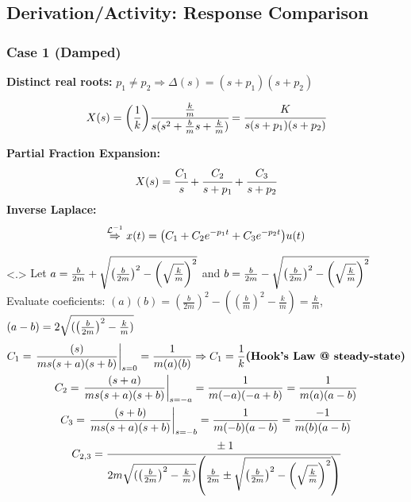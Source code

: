 \documentclass[aspectratio=169]{beamer}
\begin{document}
\subsection{Derivation/Activity: Response Comparison}
\begin{frame}
	\frametitle{Case 1 (Damped)}

	\textbf{Distinct real roots:}
	$p_1 \neq p_2 \Rightarrow \Delta(s) = (s+p_1) (s+p_2)$

	\pause{}
	\[
		X(s) = \qty(\frac{1}{k}) \cfrac{\frac{k}{m}}{s(s^2 + \frac{b}{m} s + \frac{k}{m})}
		= \cfrac{K}{s(s+p_1)(s+p_2)}
	\]
	\pause{}

	\textbf{Partial Fraction Expansion:} %
	\[
		X(s) = \cfrac{C_1}{s} + \cfrac{C_2}{s+p_1} + \cfrac{C_3}{s+p_2}
	\]
	\pause{}
	\textbf{Inverse Laplace:}
	\[
		\overset{\mathcal{L}^{-1}}{\Rightarrow}
		x(t) = \qty(C_1 + C_2 e^{-p_1t} + C_3 e^{-p_2t}) u(t)	
	\]

	{
		Let $a = \frac{b}{2m} + \sqrt{\qty(\frac{b}{2m})^2 - \qty(\sqrt{\frac{k}{m}})^2}$ and $b = \frac{b}{2m} - \sqrt{\qty(\frac{b}{2m})^2 - \qty(\sqrt{\frac{k}{m}})^2}$
		Evaluate coeficients:
		$(a)(b) = (\frac{b}{2m})^2 - ((\frac{b}{m})^2-\frac{k}{m}) = \frac{k}{m}$, \quad $(a-b) = 2\sqrt{(\qty(\frac{b}{2m})^2 - \frac{k}{m})}$
		\begin{gather*}
			C_1 = \eval{\frac{(s)}{m s(s+a)(s+b)}}_{s=0}
			= \frac{1}{m (a)(b)}
			\Rightarrow
			C_1 = \frac{1}{k} \textbf{(Hook's Law @ steady-state)}
			\\
			C_2 = \eval{\frac{(s+a)}{m s(s+a)(s+b)}}_{s=-a}
			= \frac{1}{m(-a)(-a+b)}
			= \frac{1}{m(a)(a-b)}
			\\
			C_3 = \eval{\frac{(s+b)}{m s(s+a)(s+b)}}_{s=-b}
			= \frac{1}{m(-b)(a-b)}
			= \frac{-1}{m(b)(a-b)}\\
			C_{2,3} = \cfrac{\pm 1}{2m\sqrt{(\qty(\frac{b}{2m})^2 - \frac{k}{m})} \qty(\frac{b}{2m} \pm \sqrt{\qty(\frac{b}{2m})^2 - \qty(\sqrt{\frac{k}{m}})^2})}
		\end{gather*}
	}
	
\end{frame}
\end{document}
